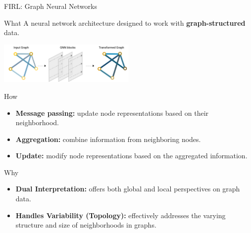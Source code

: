 \documentclass[presentation, 8pt,169]{beamer}\mode<presentation>{\usetheme{AMSBolognaFC}}
\begin{document}
\begin{frame}{FIRL: Graph Neural Networks}
  \begin{exampleblock}{What}
    A neural network architecture designed to work with \textbf{graph-structured} data.
  \end{exampleblock}

  \begin{center}
    \includegraphics[width=0.5\textwidth]{img/gnn.png}
  \end{center}

  \begin{block}{How}
    \begin{itemize}
      \item \textbf{Message passing:} update node representations based on their neighborhood.
      \item \textbf{Aggregation:} combine information from neighboring nodes.
      \item \textbf{Update:} modify node representations based on the aggregated information.
    \end{itemize}
  \end{block}

  \begin{alertblock}{Why}
    \begin{itemize}
      \item \textbf{Dual Interpretation:} offers both global and local perspectives on graph data.
      \item \textbf{Handles Variability (Topology):} effectively addresses the varying structure and size of neighborhoods in graphs.
    \end{itemize}
  \end{alertblock}
\end{frame}
\end{document}
